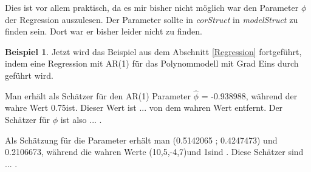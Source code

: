 \documentclass[12pt,a4paper]{article}
\theoremstyle{definition}
\newtheorem{Beispiel}[Definition]{Beispiel}
\theoremstyle{definition}
\theoremstyle{definition}
\newcommand{\nobs}{50}
\newcommand{\betatrue}{(10,5,-4,7)}
\newcommand{\phitrue}{0.75}
\newcommand{\sigmatrue}{1}
\newcommand{\betaARone}{ (0.5142065 ; 0.4247473) }
\newcommand{\sigmaARone}{0.2106673}
\newcommand{\phiestone}{-0.938988}
\newcommand{\Xidat}{...}
\begin{document}
Dies ist vor allem praktisch, da es mir bisher nicht möglich war den Parameter $\phi$ der Regression auszulesen. Der Parameter sollte in \textit{corStruct} in \textit{modelStruct} zu finden sein. Dort war er bisher leider nicht zu finden. 

\begin{Beispiel}
Jetzt wird das Beispiel aus dem Abschnitt \ref{Regression} fortgeführt, indem eine Regression mit AR(1) für das Polynommodell mit Grad Eins durch geführt wird. 

Man erhält als Schätzer für den AR(1) Parameter $\hat{\phi}$ = \phiestone , während der wahre Wert \phitrue ist. Dieser Wert ist ... von dem wahren Wert entfernt. Der Schätzer für $\phi$ ist also ... .

Als Schätzung für die Parameter erhält man \betaARone und \sigmaARone , während die wahren Werte \betatrue und \sigmatrue sind . Diese Schätzer sind ... .

%
%
%
%
%
%
%


\end{Beispiel}
\end{document}
